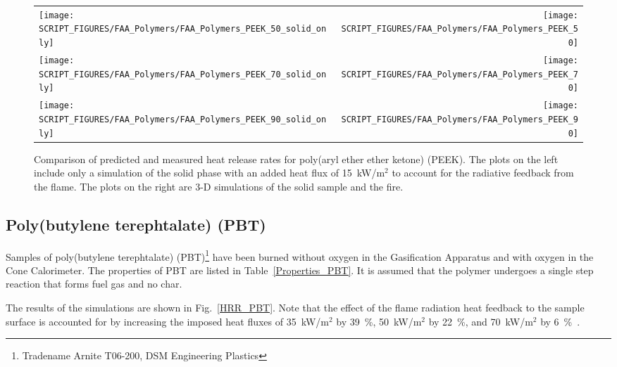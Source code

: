 \begin{figure}[p]
\begin{tabular*}{\textwidth}{l@{\extracolsep{\fill}}r}
\texttt{[image: SCRIPT\_FIGURES/FAA\_Polymers/FAA\_Polymers\_PEEK\_50\_solid\_only]} &
\texttt{[image: SCRIPT\_FIGURES/FAA\_Polymers/FAA\_Polymers\_PEEK\_50]} \\
\texttt{[image: SCRIPT\_FIGURES/FAA\_Polymers/FAA\_Polymers\_PEEK\_70\_solid\_only]} &
\texttt{[image: SCRIPT\_FIGURES/FAA\_Polymers/FAA\_Polymers\_PEEK\_70]} \\
\texttt{[image: SCRIPT\_FIGURES/FAA\_Polymers/FAA\_Polymers\_PEEK\_90\_solid\_only]} &
\texttt{[image: SCRIPT\_FIGURES/FAA\_Polymers/FAA\_Polymers\_PEEK\_90]}
\end{tabular*}
\caption[Heat release rate of poly(aryl ether ether ketone) (PEEK)]
{Comparison of predicted and measured heat release rates for poly(aryl ether ether ketone) (PEEK). The plots on the left include only a simulation of the solid phase with an added heat flux of 15~kW/m$^2$ to account for the radiative feedback from the flame. The plots on the right are 3-D simulations of the solid sample and the fire.}
\label{HRR_PEEK}
\end{figure}

\clearpage


\subsection{Poly(butylene terephtalate) (PBT)}

Samples of poly(butylene terephtalate) (PBT)\footnote{Tradename Arnite T06-200, DSM Engineering Plastics} have been burned without oxygen in the Gasification Apparatus and with oxygen in the Cone Calorimeter. The properties of PBT are listed in Table~\ref{Properties_PBT}. It is assumed that the polymer undergoes a single step reaction that forms fuel gas and no char.

The results of the simulations are shown in Fig.~\ref{HRR_PBT}. Note that the effect of the flame radiation heat feedback to the sample surface is accounted for by increasing the imposed heat fluxes of 35~kW/m$^2$ by 39~\%, 50~kW/m$^2$ by 22~\%, and 70~kW/m$^2$ by 6~\%~\cite{Kempel:1}.


